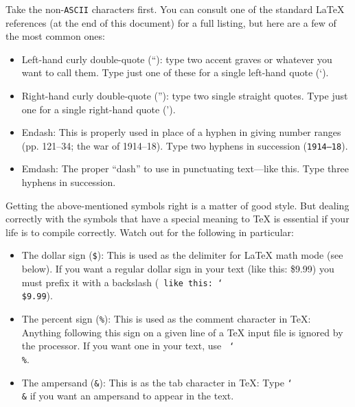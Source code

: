 \documentclass[12pt]{article}
\begin{document}
Take the non-{\tt ASCII} characters first. You can consult one of the
standard \LaTeX{} references (at the end of this document) for a full
listing, but here are a few of the most common ones:

\begin{itemize}
\item Left-hand curly double-quote (``): type two accent graves or whatever
you want to call them. Type just one of these for a single left-hand quote
(`).
\item Right-hand curly double-quote (''): type two single straight quotes.
Type just one for a single right-hand quote (').
\item Endash: This is properly used in place of a hyphen in giving number
ranges (pp. 121--34; the war of 1914--18). Type two hyphens in succession
({\tt 1914--18}).
\item Emdash: The proper ``dash'' to use in punctuating text---like this.
Type three hyphens in succession.
\end{itemize}

Getting the above-mentioned symbols right is a matter of good style. But
dealing correctly with the symbols that have a special meaning to \TeX{}
is essential if your life is to compile correctly. Watch out for the
following in particular:

\begin{itemize}
\item The dollar sign ({\tt\$}): This is used as the delimiter for
\LaTeX{} math mode (see below). If you want a regular dollar sign in your
text (like this: \$9.99) you must prefix it with a backslash ({\tt%
like this: \char`\\\$9.99}).
\item The percent sign ({\tt\%}): This is used as the comment character in
\TeX{}: Anything following this sign on a given line of a \TeX{} input
file is ignored by the processor. If you want one in your text, use {\tt%
\char`\\\%}.
\item The ampersand ({\tt\&}): This is as the tab character in \TeX{}:
Type {\tt \char`\\\&} if you want an ampersand to appear in the text.
\end{itemize}
\end{document}
